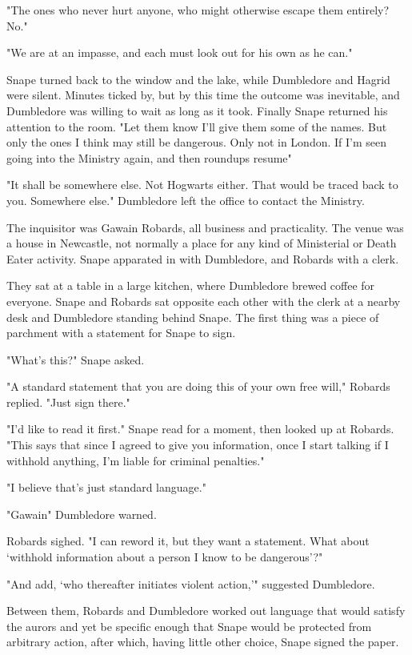 "The ones who never hurt anyone, who might otherwise escape them entirely? No."

"We are at an impasse, and each must look out for his own as he can."

Snape turned back to the window and the lake, while Dumbledore and Hagrid were silent. Minutes ticked by, but by this time the outcome was inevitable, and Dumbledore was willing to wait as long as it took. Finally Snape returned his attention to the room. "Let them know I'll give them some of the names. But only the ones I think may still be dangerous. Only not in London. If I'm seen going into the Ministry again, and then roundups resume{\el}"

"It shall be somewhere else. Not Hogwarts either. That would be traced back to you. Somewhere else." Dumbledore left the office to contact the Ministry.

The inquisitor was Gawain Robards, all business and practicality. The venue was a house in Newcastle, not normally a place for any kind of Ministerial or Death Eater activity. Snape apparated in with Dumbledore, and Robards with a clerk.

They sat at a table in a large kitchen, where Dumbledore brewed coffee for everyone. Snape and Robards sat opposite each other with the clerk at a nearby desk and Dumbledore standing behind Snape. The first thing was a piece of parchment with a statement for Snape to sign.

"What's this?" Snape asked.

"A standard statement that you are doing this of your own free will," Robards replied. "Just sign there."

"I'd like to read it first." Snape read for a moment, then looked up at Robards. "This says that since I agreed to give you information, once I start talking if I withhold anything, I'm liable for criminal penalties."

"I believe that's just standard language."

"Gawain{\el}" Dumbledore warned.

Robards sighed. "I can reword it, but they want a statement. What about `withhold information about a person I know to be dangerous'?"

"And add, `who thereafter initiates violent action,'" suggested Dumbledore.

Between them, Robards and Dumbledore worked out language that would satisfy the aurors and yet be specific enough that Snape would be protected from arbitrary action, after which, having little other choice, Snape signed the paper.

